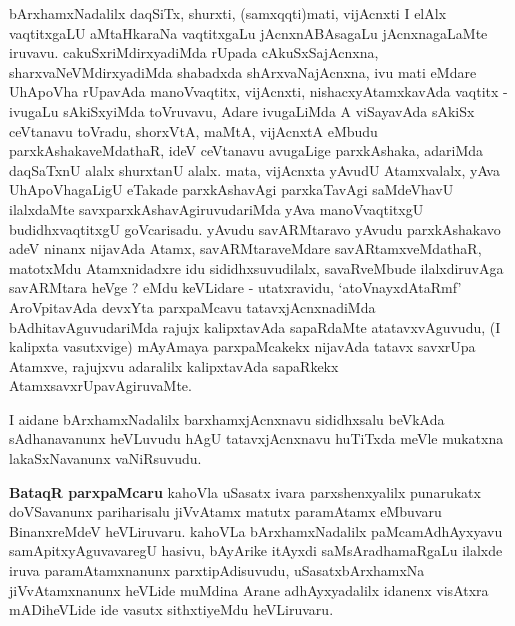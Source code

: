 \begin{artha}
bArxhamxNadalilx daqSiTx, shurxti, (samxqqti)mati, vijAcnxti I elAlx vaqtitxgaLU aMtaHkaraNa vaqtitxgaLu jAcnxnABAsagaLu jAcnxnagaLaMte iruvavu. cakuSxriMdirxyadiMda rUpada \-cAkuSxSajAcnxna, sharxvaNeVMdirxyadiMda shabadxda shArxvaNajAcnxna, ivu mati eMdare UhA\-poVha rUpavAda manoVvaqtitx, vijAcnxti, nishacxyAtamxkavAda vaqtitx - ivugaLu sAkiSx\-yiMda toVruvavu, Adare ivugaLiMda A viSayavAda sAkiSx ceVtanavu toVradu, shorxVtA, maMtA, vijAcnxtA eMbudu parxkAshakaveMdathaR, ideV ceVtanavu avugaLige parxkAshaka, adariMda daqSaTxnU alalx shurxtanU alalx. mata, vijAcnxta yAvudU Atamxvalalx, yAva UhApoVhagaLigU eTakade parxkAshavAgi parxkaTavAgi saMdeVhavU ilalxdaMte savxparxkAshavAgiruvudariMda yAva manoVvaqtitxgU budidhxvaqtitxgU goVcarisadu. yAvudu savARMtaravo yAvudu parxkAshakavo adeV ninanx nijavAda Atamx, savARMtaraveMdare savARtamxveMdathaR, matotxMdu Atamxnidadxre idu sididhx\-suvudilalx, savaRveMbude ilalxdiruvAga savARMtara heVge ? eMdu keVLidare - utatxravidu, `atoV\s nayxdAtaRmf' AroVpitavAda devxYta parxpaMcavu tatavxjAcnxnadiMda bAdhitavAguvudariMda rajujx kalipxtavAda sapaRdaMte atatavxvAguvudu, (I kalipxta vasutxvige) mAyAmaya parxpaMcakekx nijavAda tatavx savxrUpa Atamxve, rajujxvu adaralilx kalipxtavAda sapaRkekx AtamxsavxrUpavAgiruvaMte. 
\end{artha}


\begin{artha}
I aidane bArxhamxNadalilx barxhamxjAcnxnavu sididhxsalu beVkAda sAdhanavanunx heVLuvudu hAgU tatavxjAcnxnavu huTiTxda meVle mukatxna lakaSxNavanunx vaNiRsuvudu.
\end{artha}


\begin{artha}
{\bf BataqR parxpaMcaru} kahoVla uSasatx ivara parxshenxyalilx punarukatx doVSavanunx pariharisalu jiVvAtamx matutx paramAtamx eMbuvaru BinanxreMdeV heVLiruvaru. \-kahoVLa bArxhamxNadalilx paMcamAdhAyxyavu samApitxyAguvavaregU hasivu, \break bAyArike itAyxdi saMsAradhamaRgaLu ilalxde iruva paramAtamxnanunx parxtipAdisu\-vudu, uSasatxbArxhamxNa jiVvAtamxnanunx heVLide muMdina Arane adhAyxyadalilx idanenx visAtxra mADiheVLide ide vasutx sithxtiyeMdu heVLiruvaru.
\end{artha}


